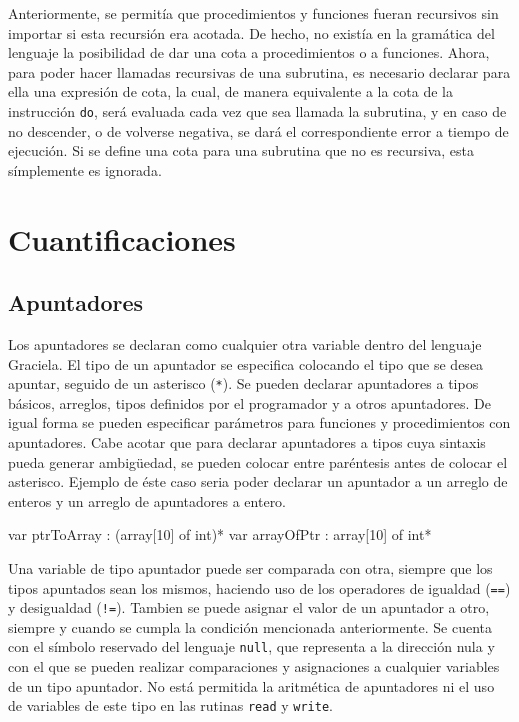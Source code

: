 Anteriormente, se permitía que procedimientos y funciones fueran recursivos sin
importar si esta recursión era acotada. De hecho, no existía en la gramática del
lenguaje la posibilidad de dar una cota a procedimientos o a funciones. Ahora,
para poder hacer llamadas recursivas de una subrutina, es necesario declarar
para ella una expresión de cota, la cual, de manera equivalente a la cota de la
instrucción \texttt{do}, será evaluada cada vez que sea llamada la subrutina, y
en caso de no descender, o de volverse negativa, se dará el correspondiente
error a tiempo de ejecución. Si se define una cota para una subrutina que no es
recursiva, esta símplemente es ignorada.

\section{Cuantificaciones}


\subsection{Apuntadores}

Los apuntadores se declaran como cualquier otra variable dentro del lenguaje
Graciela. El tipo de un apuntador se especifica colocando el tipo que se desea
apuntar, seguido de un asterisco (\texttt{*}). Se pueden declarar apuntadores
a tipos básicos, arreglos, tipos definidos por el programador y a otros
apuntadores. De igual forma se pueden especificar parámetros para funciones y
procedimientos con apuntadores. Cabe acotar que para declarar apuntadores a
tipos cuya sintaxis pueda generar ambigüedad, se pueden colocar entre paréntesis
antes de colocar el asterisco. Ejemplo de éste caso seria poder declarar un apuntador a
un arreglo de enteros y un arreglo de apuntadores a entero.

\begin{gracielacode}
var ptrToArray : (array[10] of int)*
var arrayOfPtr :  array[10] of int*
\end{gracielacode}

Una variable de tipo apuntador puede ser comparada con otra, siempre que los
tipos apuntados sean los mismos, haciendo uso de los operadores de igualdad
(\texttt{==}) y desigualdad (\texttt{!=}). Tambien se puede asignar el valor
de un apuntador a otro, siempre y cuando se cumpla la condición mencionada
anteriormente. Se cuenta con el símbolo reservado del lenguaje
\texttt{null}, que representa a la dirección nula y con el que se pueden
realizar comparaciones y asignaciones a cualquier variables de un
tipo apuntador. No está permitida la aritmética de apuntadores ni el uso de
variables de este tipo en las rutinas \texttt{read} y \texttt{write}.

